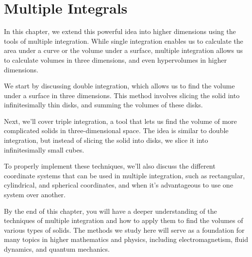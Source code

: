 \chapter{Multiple Integrals}


In this chapter, we extend this powerful idea into higher dimensions using the tools of multiple integration. While single integration enables us to calculate the area under a curve or the volume under a surface, multiple integration allows us to calculate volumes in three dimensions, and even hypervolumes in higher dimensions.

We start by discussing double integration, which allows us to find the volume under a surface in three dimensions. This method involves slicing the solid into infinitesimally thin disks, and summing the volumes of these disks.

Next, we'll cover triple integration, a tool that lets us find the volume of more complicated solids in three-dimensional space. The idea is similar to double integration, but instead of slicing the solid into disks, we slice it into infinitesimally small cubes.

To properly implement these techniques, we'll also discuss the different coordinate systems that can be used in multiple integration, such as rectangular, cylindrical, and spherical coordinates, and when it's advantageous to use one system over another.

By the end of this chapter, you will have a deeper understanding of the techniques of multiple integration and how to apply them to find the volumes of various types of solids. The methods we study here will serve as a foundation for many topics in higher mathematics and physics, including electromagnetism, fluid dynamics, and quantum mechanics.

